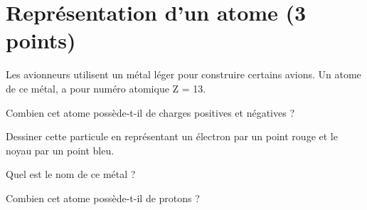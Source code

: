 \section{Représentation d'un atome (3 points)}\label{ex:avions}

Les avionneurs utilisent un métal léger pour construire certains avions. Un atome de ce métal, a pour numéro atomique Z = 13.

\begin{questions}
	\question[1] Combien cet atome possède-t-il de charges positives et négatives ?
	
	\question[1] Dessiner cette particule en représentant un électron par un point rouge et le noyau par un point bleu.
	
	\question[1] Quel est le nom de ce métal ?
	
	\question[1] Combien cet atome possède-t-il de protons ?
\end{questions}
